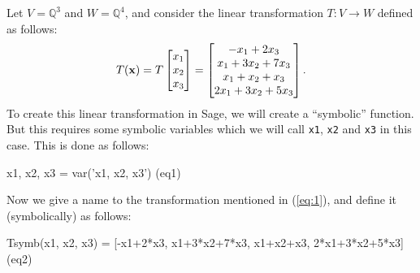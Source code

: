 \documentclass[fleqn,11pt]{paper}
\theoremstyle{remark}
\newcommand\Q{\fld{Q}}
\renewcommand{\vec}[1]{\mathbf{#1}}
\newcommand{\<}{\ensuremath{\langle}}
\renewcommand{\>}{\ensuremath{\rangle}}
\newcommand\fld[1]{\ensuremath{\mathbb{#1}}}
\newcommand\vx{\vec{x}}
\begin{document}
Let $V = \Q^3$ and 
$W = \Q^4$, and consider the linear transformation $T: V \to W$ defined as follows:
%
\begin{equation}
\label{eq:1}
T(\vx) = T \colvector{x_1\\x_2\\x_3} =\colvector{-x_1 + 2x_3\\x_1 + 3x_2 + 7x_3\\x_1 + x_2 + x_3\\2x_1 + 3x_2 + 5x_3}.
\end{equation}
%
To create this linear transformation in Sage, we will create a ``symbolic'' function.
But this requires some symbolic variables which we will call \verb!x1!, \verb!x2! and \verb!x3! 
in this case.  This is done as follows:
%
\begin{sageblock}
x1, x2, x3 = var('x1, x2, x3')                                            (eq1)
\end{sageblock}
%
Now we give a name to the transformation mentioned in (\ref{eq:1}), and define it (symbolically) as follows:
%
\begin{sageblock}
Tsymb(x1, x2, x3) = [-x1+2*x3, x1+3*x2+7*x3, x1+x2+x3, 2*x1+3*x2+5*x3]    (eq2)
\end{sageblock}
%
\newpage
\end{document}
